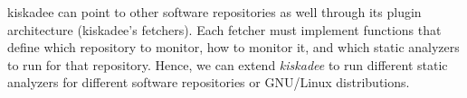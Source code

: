 kiskadee can point to other software repositories as well through its plugin
architecture (kiskadee's fetchers). Each fetcher must implement functions that
define which repository to monitor, how to monitor it, and which static
analyzers to run for that repository. Hence, we can extend \textit{kiskadee} to
run different static analyzers for different software repositories or GNU/Linux
distributions.
